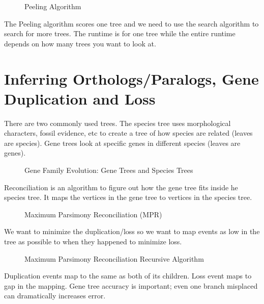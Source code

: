 \begin{figure}[ht!]
  \centering
  \caption{Peeling Algorithm}
  \label{Fig06_PeelingAlgorithm}
\end{figure}

\noindent The Peeling algorithm scores one tree and we need to use the
search algorithm to search for more trees. The runtime is for one tree
while the entire runtime depends on how many trees you want to look
at.

\section{Inferring Orthologs/Paralogs, Gene Duplication and Loss}

\noindent There are two commonly used trees. The species tree uses
morphological characters, fossil evidence, etc to create a tree of how
species are related (leaves are species). Gene trees look at specific
genes in different species (leaves are genes).

\begin{figure}[ht!]
  \centering
  \caption{Gene Family Evolution: Gene Trees and Species Trees}
  \label{Fig07_GeneFamilyEvolution}
\end{figure}

\noindent Reconciliation is an algorithm to figure out how the gene tree fits inside  he species tree. It maps the vertices in the gene tree to vertices in the species tree. 

\begin{figure}[ht!]
  \centering
  \caption{Maximum Parsimony Reconciliation (MPR) } 
  \label{Fig08_MaximumParsimonyReconciliation}
\end{figure}

\noindent We want to minimize the duplication/loss so we want to map
events as low in the tree as possible to when they happened to
minimize loss.

\begin{figure}[ht!]
  \centering
  \caption{Maximum Parsimony Reconciliation Recursive Algorithm} 
  \label{Fig09_MPRAlgorithm}
\end{figure}

Duplication events map to the same as both of its children. Loss event
maps to gap in the mapping. Gene tree accuracy is important; even one
branch misplaced can dramatically increases error.

